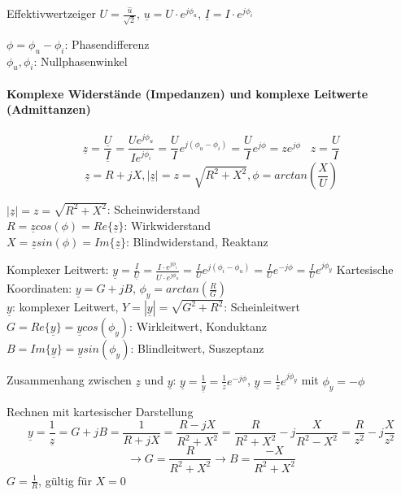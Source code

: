 \documentclass[german]{article}
\begin{document}
Effektivwertzeiger $U = \frac{\hat{u}}{\sqrt{2}}$, $\underline{u} = U \cdot e^{j\phi_u}$, $\underline{I} = I \cdot e^{j\phi_i}$

$\phi = \phi_u - \phi_i$: Phasendifferenz \\
$\phi_u, \phi_i$: Nullphasenwinkel

\paragraph{Komplexe Widerstände (Impedanzen) und komplexe Leitwerte (Admittanzen)}
\[ \underline{z} = \frac{\underline{U}}{\underline{I}} = \frac{U e^{j\phi_u}}{I e^{j\phi_i}} = \frac{U}{I} e^{j(\phi_u - \phi_i)} = \frac{U}{I} e^{j\phi} = z e^{j\phi} \hspace{10pt} z = \frac{U}{I} \]
\[ \underline{z} = R + jX, |\underline{z}| = z = \sqrt{R^2 + X^2}, \phi = arctan\left( \frac{X}{U} \right) \]

$|\underline{z}| = z = \sqrt{R^2 + X^2}$: Scheinwiderstand \\
$R = \underline{z} cos(\phi) = Re\{\underline{z}\}$: Wirkwiderstand \\
$X = \underline{z} sin(\phi) = Im\{\underline{z}\}$: Blindwiderstand, Reaktanz

Komplexer Leitwert: $\underline{y} = \frac{\underline{I}}{\underline{U}} = \frac{I \cdot e^{j\phi_i}}{U \cdot e^{j\phi_u}} = \frac{I}{U} e^{j(\phi_i - \phi_u)} = \frac{I}{U} e^{-j\phi} = \frac{I}{U} e^{j\phi_y}$
Kartesische Koordinaten: $\underline{y} = G + jB$, $\phi_y = arctan\left( \frac{R}{G} \right)$ \\
$\underline{y}$: komplexer Leitwert, $Y = |\underline{y}| = \sqrt{G^2 + R^2}$: Scheinleitwert \\
$G = Re\{\underline{y}\} = \underline{y} cos(\phi_y)$: Wirkleitwert, Konduktanz \\
$B = Im\{\underline{y}\} = \underline{y} sin(\phi_y)$: Blindleitwert, Suszeptanz

Zusammenhang zwischen $\underline{z}$ und $\underline{y}$: $\underline{y} = \frac1{\underline{y}} = \frac1z e^{-j\phi}$, $\underline{y} = \frac1z e^{j\phi_y}$ mit $\phi_y = -\phi$

Rechnen mit kartesischer Darstellung
\[ \underline{y} = \frac1{\underline{z}} = G + jB = \frac1{R + jX} = \frac{R - jX}{R^2 + X^2} = \frac{R}{R^2 + X^2} - j\frac{X}{R^2 - X^2} = \frac{R}{z^2} - j \frac{X}{z^2}\]
\[ \rightarrow G = \frac{R}{R^2 + X^2} \rightarrow B = \frac{-X}{R^2 + X^2} \]
$G = \frac1R$, gültig für $X = 0$
\end{document}
